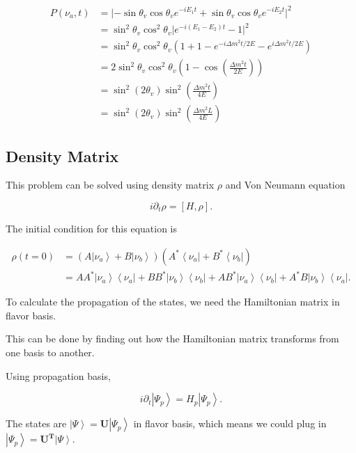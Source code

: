 \documentclass{tufte-handout}
\newcommand{\bra}[1]{\left\langle #1\right|}
\newcommand{\ket}[1]{\left| #1\right\rangle}
\begin{document}
\begin{itemize}
    \begin{align*}
    P(\nu_a,t) & = \lvert -\sin\theta_v \cos\theta_v e^{-iE_1t} + \sin\theta_v \cos\theta_v e^{-iE_2t}  \rvert^2 \\
    & = \sin^2\theta_v \cos^2\theta_v \lvert e^{-i(E_1 - E_2)t} - 1 \rvert^2 \\
    & = \sin^2\theta_v \cos^2\theta_v \left(  1 +1 - e^{-i \Delta m^2 t/2E} -  e^{i \Delta m^2 t/2E}  \right) \\
    & = 2 \sin^2\theta_v \cos^2\theta_v \left( 1- \cos\left( \frac{\Delta m^2 t}{2E} \right) \right) \\
    & = \sin^2 ( 2\theta_v ) \sin^2\left( \frac{\Delta m^2 t}{4E}  \right) \\
    &  = \sin^2 ( 2\theta_v ) \sin^2\left( \frac{\Delta m^2 L}{4E}  \right)
    \end{align*}
    
\end{itemize}


\subsection{Density Matrix}

This problem can be solved using density matrix $\rho$ and Von Neumann equation

\begin{equation}
i \partial_t \rho = [H,\rho].
\end{equation}


The initial condition for this equation is

\begin{align*}
\rho(t=0) &= (A \ket{\nu_a} + B \ket{\nu_b} )(A^* \bra{\nu_a} + B^* \bra{\nu_b} ) \\
& = A A^* \ket{\nu_a}\bra{\nu_a} + B B^* \ket{\nu_b}\bra{\nu_b} + A B^* \ket{\nu_a}\bra{\nu_b} + A^* B \ket{\nu_b} \bra{\nu_a} .
\end{align*}

To calculate the propagation of the states, we need the Hamiltonian matrix in flavor basis.

This can be done by finding out how the Hamiltonian matrix transforms from one basis to another.

Using propagation basis,

\begin{equation}
i\partial_t \ket{\Psi_p} = H_p \ket{\Psi_p}.
\end{equation}

The states are $\ket{\Psi} = \mathbf{U} \ket{\Psi_p} $ in flavor basis, which means we could plug in $\ket{\Psi_p} = \mathbf{U^T}\ket{\Psi}$.
\end{document}
